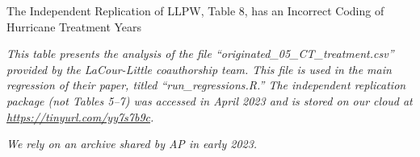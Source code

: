 \documentclass{article}
\begin{document}
\begin{table}
\caption{The Independent Replication of LLPW, Table 8, has an Incorrect Coding of Hurricane Treatment Years}

\emph{This table presents the analysis of the file “originated\_05\_CT\_treatment.csv” provided by the LaCour-Little coauthorship team. This file is used in the main regression of their paper, titled “run\_regressions.R.” The independent replication package (not Tables 5--7) was accessed in April 2023 and is stored on our cloud at \url{https://tinyurl.com/yy7s7b9c}.}

\begin{center}

\end{center}

\emph{We rely on an archive shared by AP in early 2023.}

\end{table}
\end{document}

